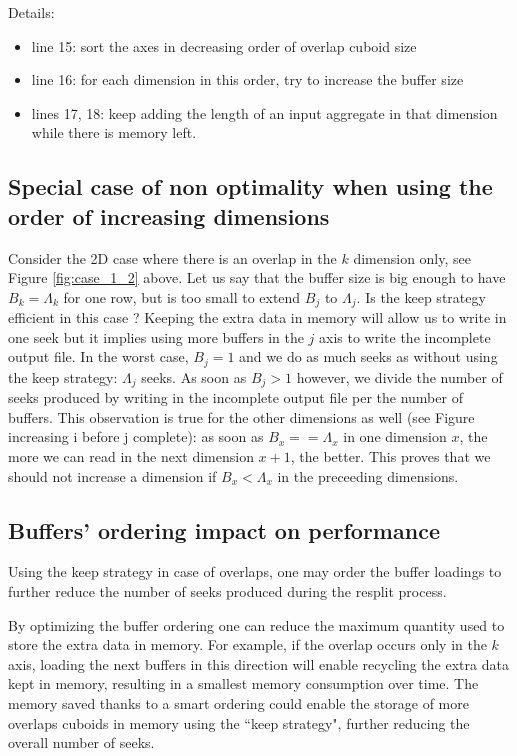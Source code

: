 \documentclass[conference]{IEEEtran}
\begin{document}
Details:
\begin{itemize}
  \item line 15: sort the axes in decreasing order of overlap cuboid size
  \item line 16: for each dimension in this order, try to increase the buffer size
  \item lines 17, 18: keep adding the length of an input aggregate in that dimension while there is memory left.
\end{itemize}

\subsection{Special case of non optimality when using the order of increasing dimensions}

Consider the 2D case where there is an overlap in the $k$ dimension only, see Figure \ref{fig:case_1_2} above.
Let us say that the buffer size is big enough to have $B_k = \Lambda_k$ for one row, but is too small to extend $B_j$ to $\Lambda_j$.
Is the keep strategy efficient in this case ?
Keeping the extra data in memory will allow us to write in one seek but it implies using more buffers in the $j$ axis to write the incomplete output file.
In the worst case, $B_j = 1$ and we do as much seeks as without using the keep strategy: $\Lambda_j$ seeks.
As soon as $B_j > 1$ however, we divide the number of seeks produced by writing in the incomplete output file per the number of buffers.
This observation is true for the other dimensions as well (see Figure increasing i before j complete): as soon as $B_x == \Lambda_x$ in one dimension $x$, the more we can read in the next dimension $x+1$, the better.
This proves that we should not increase a dimension if $B_x < \Lambda_x$ in the preceeding dimensions.

\subsection{Buffers' ordering impact on performance}

Using the keep strategy in case of overlaps, one may order the buffer loadings to further reduce the number of seeks produced during the resplit process.

By optimizing the buffer ordering one can reduce the maximum quantity used to store the extra data in memory.
For example, if the overlap occurs only in the $k$ axis, loading the next buffers in this direction will enable recycling the extra data kept in memory, resulting in a smallest memory consumption over time.
The memory saved thanks to a smart ordering could enable the storage of more overlaps cuboids in memory using the ``keep strategy", further reducing the overall number of seeks. \\
\end{document}
